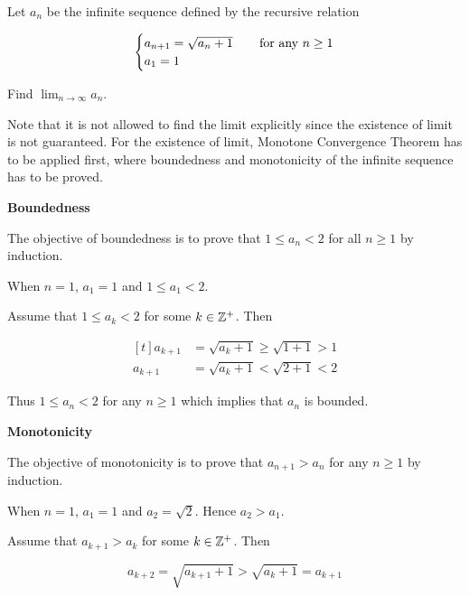 \documentclass[a4paper,12pt]{article}
\begin{document}
\begin{exm}
  Let $a_{n}$ be the infinite sequence defined by the recursive relation

  $$\begin{cases}
    a_{n+1}=\sqrt{a_{n}+1}&\;\;\;\;\text{for any }n\geq 1\\
    a_{1}=1&
  \end{cases}$$\s

  Find $\lim_{n\to \infty}a_{n}$.\n

  \ans Note that it is not allowed to find the limit explicitly since the existence of limit is not guaranteed. For the existence of limit, Monotone Convergence Theorem has to be applied first, where boundedness and monotonicity of the infinite sequence has to be proved.\n

  \begin{alist}
   \item \textbf{Boundedness}\n

   The objective of boundedness is to prove that $1\leq a_{n}<2$ for all $n\geq 1$ by induction.

   \begin{rlist}
     \item When $n=1$, $a_{1}=1$ and $1\leq a_{1}<2$.

     \item Assume that $1\leq a_{k}<2$ for some $k\in\mathbb{Z}^{+}$. Then

     $$\begin{aligned}[t]
       a_{k+1}&=\sqrt{a_{k}+1}\geq\sqrt{1+1}>1\\
       a_{k+1}&=\sqrt{a_{k}+1}<\sqrt{2+1}<2
     \end{aligned}$$
   \end{rlist}

   Thus $1\leq a_{n}<2$ for any $n\geq 1$ which implies that $a_{n}$ is bounded.

   \item \textbf{Monotonicity}\n

   The objective of monotonicity is to prove that $a_{n+1}>a_{n}$ for any $n\geq 1$ by induction.

   \begin{rlist}
     \item When $n=1$, $a_{1}=1$ and $a_{2}=\sqrt{2}$. Hence $a_{2}>a_{1}$.

     \item Assume that $a_{k+1}>a_{k}$ for some $k\in\mathbb{Z}^{+}$. Then

     $$a_{k+2}=\sqrt{a_{k+1}+1}>\sqrt{a_{k}+1}=a_{k+1}$$
   \end{rlist}


\end{alist}
\end{exm}
\end{document}
